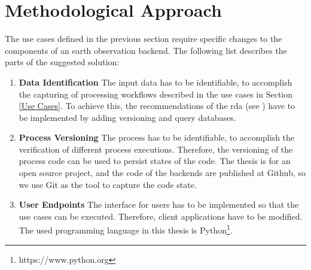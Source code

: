 \documentclass[draft,final]{vutinfth} %
\begin{document}
\section{Methodological Approach}\label{Method}
The use cases defined in the previous section require specific changes to the components of an earth observation backend. The following list describes the parts of the suggested solution: 

\begin{enumerate}
	\item \textbf{Data Identification}
	The input data has to be identifiable, to accomplish the capturing of processing workflows described in the use cases in Section \ref{Use Cases}. To achieve this, the recommendations of the \gls{rda} (see \cite{rauber2016identification}) have to be implemented by adding versioning and query databases.
	
	\item \textbf{Process Versioning}
	The process has to be identifiable, to accomplish the verification of different process executions. Therefore, the versioning of the process code can be used to persist states of the code. The thesis is for an open source project, and the code of the backends are published at Github, so we use Git as the tool to capture the code state. 
		
	\item \textbf{User Endpoints}
	The interface for users has to be implemented so that the use cases can be executed. Therefore, client applications have to be modified. The used programming language in this thesis is Python\footnote{https://www.python.org}.
\end{enumerate}
\end{document}
